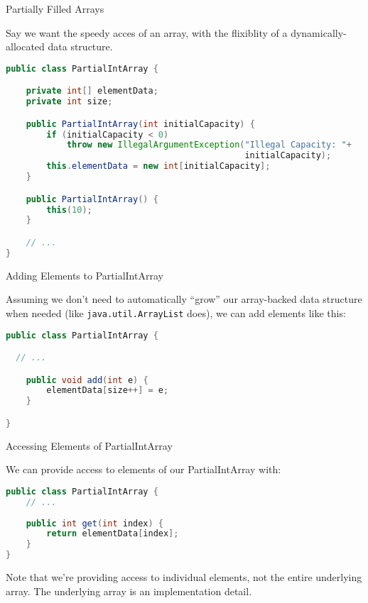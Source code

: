\documentclass{beamer}
\begin{document}
\begin{frame}[fragile]{Partially Filled Arrays}


Say we want the speedy acces of an array, with the flixiblity of a dynamically-allocated data structure.

\begin{lstlisting}[language=Java]
public class PartialIntArray {

    private int[] elementData;
    private int size;

    public PartialIntArray(int initialCapacity) {
        if (initialCapacity < 0)
            throw new IllegalArgumentException("Illegal Capacity: "+
                                               initialCapacity);
        this.elementData = new int[initialCapacity];
    }

    public PartialIntArray() {
        this(10);
    }

    // ...
}
\end{lstlisting}

\end{frame}

\begin{frame}[fragile]{Adding Elements to PartialIntArray}


Assuming we don't need to automatically ``grow'' our array-backed data structure when needed (like {\tt java.util.ArrayList} does), we can add elements like this:

\begin{lstlisting}[language=Java]
public class PartialIntArray {

  // ...

    public void add(int e) {
        elementData[size++] = e;
    }

}
\end{lstlisting}

\end{frame}

\begin{frame}[fragile]{Accessing Elements of PartialIntArray}


We can provide access to elements of our PartialIntArray with:

\begin{lstlisting}[language=Java]
public class PartialIntArray {
    // ...
    
    public int get(int index) {
        return elementData[index];
    }
}
\end{lstlisting}

Note that we're providing access to individual elements, not the entire underlying array.  The underlying array is an implementation detail.
\end{frame}
\end{document}
